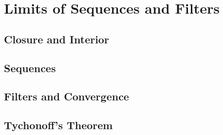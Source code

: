 \chapter{Limits of Sequences and Filters}

\section{Closure and Interior}



\section{Sequences}










\section{Filters and Convergence}












\section{Tychonoff’s Theorem}





